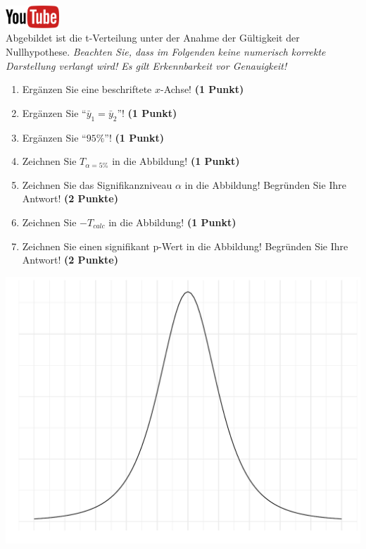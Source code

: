 \documentclass[a4paper, 9pt]{scrartcl}\usepackage[]{graphicx}\usepackage[]{xcolor}
\makeatletter
\def\maxwidth{ %
  \ifdim\Gin@nat@width>\linewidth
    \linewidth
  \else
    \Gin@nat@width
  \fi
}
\makeatother
\begin{document}
\hfill\href{https://youtu.be/32JjH1eyuTU}{\includegraphics[width =
  2cm]{img/youtube}}\\[1Ex]



Abgebildet ist die t-Verteilung unter der Anahme der G{\"u}ltigkeit der
Nullhypothese. \textit{Beachten Sie, dass im Folgenden keine
  numerisch korrekte Darstellung verlangt wird! Es gilt Erkennbarkeit vor
  Genauigkeit!}

\begin{enumerate}
\item Erg{\"a}nzen Sie eine beschriftete $x$-Achse! \textbf{(1 Punkt)}
\item Erg{\"a}nzen Sie "`$\bar{y}_1 = \bar{y}_2$"'! \textbf{(1 Punkt)} 
\item Erg{\"a}nzen Sie "`$95\%$"'! \textbf{(1 Punkt)}
\item Zeichnen Sie $T_{\alpha=5\%}$ in die Abbildung! \textbf{(1 Punkt)} 
\item Zeichnen Sie das Signifikanzniveau $\alpha$ in die Abbildung! Begr{\"u}nden
  Sie Ihre Antwort! \textbf{(2 Punkte)} 
\item Zeichnen Sie $-T_{calc}$ in die Abbildung! \textbf{(1
    Punkt)}
\item Zeichnen Sie einen signifikant p-Wert in die Abbildung! Begr{\"u}nden
  Sie Ihre Antwort! \textbf{(2 Punkte)}   
\end{enumerate}



{\centering \includegraphics[width=\maxwidth]{img/statistisches-testen-3-1} 

}
\end{document}
